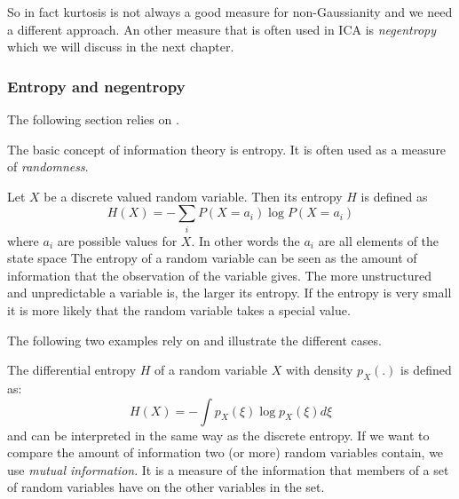 \documentclass[12pt, a4paper]{article}
\numberwithin{equation}{section}
\numberwithin{figure}{section}
\numberwithin{table}{section}
\begin{document}
	So in fact kurtosis is not always a good measure for non-Gaussianity and we need a different approach.
	An other measure that is often used in ICA is \textit{negentropy} which we will discuss in the next chapter.
	
	\subsubsection{Entropy and negentropy} \label{entropy}
	
	The following section relies on \citet{ICA_Book}.
	
	The basic concept of information theory is entropy.
	It is often used as a measure of \textit{randomness}.
	
	Let \mbox{$X$} be a discrete valued random variable. Then its entropy \mbox{$H$} is defined as
	\begin{equation}
	H(X)=-\sum_i P(X=a_i) \log P(X=a_i)
	\end{equation}
	where \mbox{$a_i$} are possible values for \mbox{$X$}. In other words the \mbox{$a_i$} are all elements of the state space%
	The entropy of a random variable can be seen as the amount of information that the observation of the variable gives.
	The more unstructured and unpredictable a variable is, the larger its entropy. 
	If the entropy is very small it is more likely that the random variable takes a special value. %
	
	The following two examples rely on \citet{ICA_Book} and illustrate the different cases.
	
	The differential entropy \mbox{$H$} of a random variable \mbox{$X$} with density \mbox{$p_X(.)$} is defined as:
	\begin{equation}
	H(X)= - \int p_X(\xi) \log p_X(\xi) d\xi
	\end{equation}
	and can be interpreted in the same way as the discrete entropy.
	If we want to compare the amount of information two (or more) random variables contain, we use \textit{mutual information}. It is a measure of the information that members of a set of random variables have on the other variables in the set.
	
\end{document}
